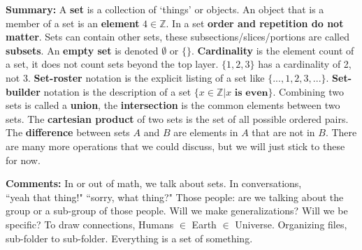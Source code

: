 \begin{greenbox}
    \textbf{Summary:} A \textbf{set} is a collection of `things' or objects. An object that is a member of a set is an
    \textbf{element} $4\in\mathbb{Z}$. In a set \textbf{order and
        repetition do not matter}. Sets can contain other sets, these subsections/slices/portions are
    called \textbf{subsets}. An \textbf{empty set} is denoted $\emptyset$ or $\{\}$. \textbf{Cardinality} is the element
    count of a set, it does not count sets beyond the top layer. $\{1, {2, 3}\}$ has a cardinality of 2, not 3.
    \textbf{Set-roster} notation is the explicit listing of a set like $\{...,1,2,3,...\}$. \textbf{Set-builder}
    notation is the description of a set $\{x\in \mathbb{Z} | x \textbf{ is even}\}$. Combining two sets is called a \textbf{union},
    the \textbf{intersection} is the common elements between two sets. The \textbf{cartesian product} of two sets is the set of all possible
    ordered pairs. The \textbf{difference} between sets $A$ and $B$ are elements in $A$ that are not in $B$. There
    are many more operations that we could discuss, but we will just stick to these for now.
\end{greenbox}

\begin{graybox}
    \textbf{Comments:} In or out of math, we talk about sets. In conversations,\\
    ``yeah that thing!" ``sorry, what thing?"
    Those people: are we talking about the group or a sub-group of those people. Will we make generalizations?
    Will we be specific? To draw connections, Humans $\in$
    Earth $\in$ Universe. Organizing files, sub-folder to sub-folder. Everything is a set of something.
\end{graybox}